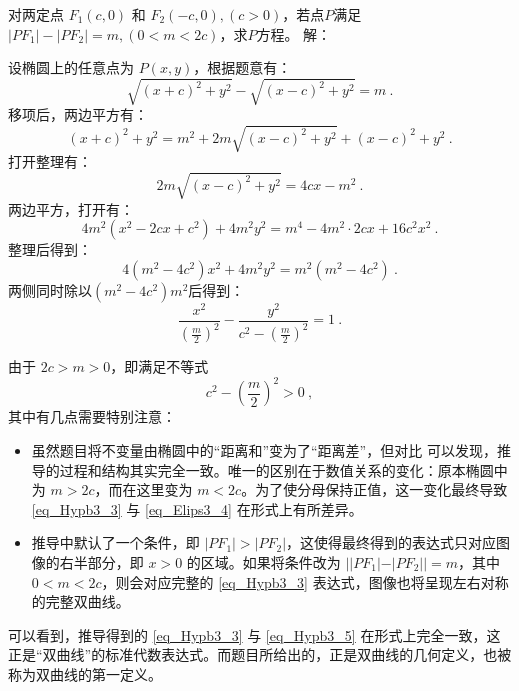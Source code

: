 \begin{example}{对两定点 $F_1(c, 0)$ 和 $F_2(-c, 0),(c>0)$，若点$P$满足$|PF_1| - |PF_2| = m,(0<m <2c)$，求$P$方程。}
解：

设椭圆上的任意点为 $P(x, y)$，根据题意有：
\begin{equation}
\sqrt{(x + c)^2 + y^2} - \sqrt{(x - c)^2 + y^2} = m~.
\end{equation}
移项后，两边平方有：
\begin{equation}
(x + c)^2 + y^2 = m^2 + 2m\sqrt{(x - c)^2 + y^2} + (x - c)^2 + y^2~.
\end{equation}
打开整理有：
\begin{equation}
2m\sqrt{(x - c)^2 + y^2}= 4cx - m^2~.
\end{equation}
两边平方，打开有：
\begin{equation}
4m^2(x^2 - 2cx+c^2) + 4m^2y^2= m^4-4m^2\cdot2cx+16c^2x^2~.
\end{equation}
整理后得到：
\begin{equation}
4(m^2 -4c^2)x^2 + 4m^2y^2= m^2(m^2-4c^2)~.
\end{equation}
两侧同时除以$(m^2-4c^2)m^2$后得到：
\begin{equation}\label{eq_Hypb3_3}
\frac{x^2}{\left(\displaystyle\frac{m}{2}\right)^2} -\frac{y^2}{\displaystyle c^2-\left(\frac{m}{2}\right)^2}=1~.
\end{equation}
\end{example}

由于 $2c > m > 0$，即满足不等式
$$
c^2 - \left( \frac{m}{2} \right)^2 > 0~,
$$
其中有几点需要特别注意：

\begin{itemize}
\item 虽然题目将不变量由椭圆中的“距离和”变为了“距离差”，但对比  可以发现，推导的过程和结构其实完全一致。唯一的区别在于数值关系的变化：原本椭圆中为 $m > 2c$，而在这里变为 $m < 2c$。为了使分母保持正值，这一变化最终导致 \autoref{eq_Hypb3_3} 与 \autoref{eq_Elips3_4} 在形式上有所差异。

\item 推导中默认了一个条件，即 $|PF_1| > |PF_2|$，这使得最终得到的表达式只对应图像的右半部分，即 $x > 0$ 的区域。如果将条件改为 $||PF_1| - |PF_2|| = m$，其中 $0 < m < 2c$，则会对应完整的 \autoref{eq_Hypb3_3} 表达式，图像也将呈现左右对称的完整双曲线。
\end{itemize}

可以看到，推导得到的 \autoref{eq_Hypb3_3} 与 \autoref{eq_Hypb3_5} 在形式上完全一致，这正是“双曲线”的标准代数表达式。而题目所给出的，正是双曲线的几何定义，也被称为双曲线的第一定义。




